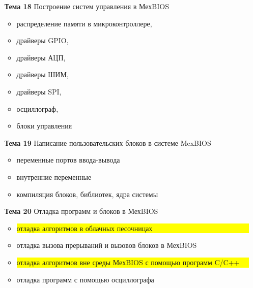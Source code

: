 \begin{itemize}
\begin{itemize}
   \end{itemize}
\item[\bf{Тема 18}]{Построение систем управления в МехBIOS}
  \begin{itemize}
   \item распределение памяти в микроконтроллере,
   \item драйверы GPIO,
   \item драйверы АЦП,
   \item драйверы ШИМ,
   \item драйверы SPI,
   \item осциллограф,
   \item блоки управления
  \end{itemize}
\item[\bf{Тема 19}]{Написание пользовательских блоков в системе MexBIOS}
       \begin{itemize}
          \item переменные портов ввода-вывода
          \item внутренние переменные
          \item компиляция блоков, библиотек, ядра системы
       \end{itemize}
\item[\bf{Тема 20}]{Отладка программ и блоков в МехBIOS}
      \begin{itemize}
        \item \colorbox{yellow}{\parbox[t]{0.8\textwidth}{отладка алгоритмов в облачных песочницах}}
        \item отладка вызова прерываний и вызовов блоков в МехBIOS
        \item \colorbox{yellow}{\parbox[t]{0.9\textwidth}{отладка алгоритмов вне среды МехBIOS с помощью программ C/C++}}
        \item отладка программ с помощью осциллографа
     \end{itemize}
\end{itemize}

\newpage
